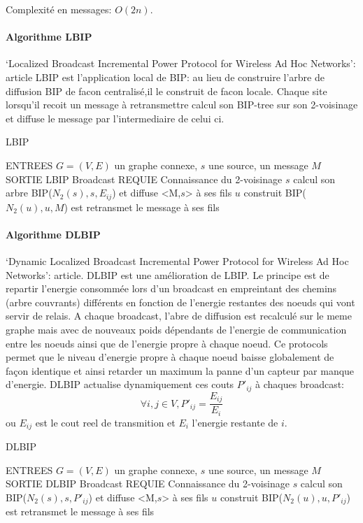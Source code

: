 Complexité en messages: $O(2n)$.


\paragraph{Algorithme LBIP}  `Localized Broadcast Incremental Power Protocol for Wireless Ad Hoc Networks': article \cite{Ingelrest2004}
LBIP est l'application local de BIP: au lieu de construire l'arbre de diffusion BIP de facon centralisé,il le construit de facon locale.
Chaque site lorsqu'il recoit un message à retransmettre calcul son BIP-tree sur son 2-voisinage et diffuse le message par l'intermediaire de celui ci.

\begin{algorithm}[h]
\caption{LBIP}
\label{algo_LBIP}
\begin{algorithmic}
\STATE ENTREES  $G=(V,E)$ un graphe connexe, $s$ une source, un message $M$
\STATE SORTIE  LBIP Broadcast
\STATE REQUIE  Connaissance du 2-voisinage
\STATE $s$ calcul son arbre BIP($N_2(s),s,E_{ij}$) et diffuse <M,$s$> à ses fils
		\STATE $u$ construit BIP($N_2(u),u,M$) est retransmet le message à ses fils
	\ENDIF
\ENDIF
\end{algorithmic}
\end{algorithm}


\paragraph{Algorithme DLBIP}
`Dynamic Localized Broadcast Incremental Power Protocol for Wireless Ad Hoc Networks': article\cite{Champ2009DLBIP}.
DLBIP est une amélioration de LBIP. Le principe est de repartir l'energie consommée lors d'un broadcast en empreintant des chemins (arbre couvrants) différents en fonction de l'energie restantes des noeuds qui vont servir de relais.
A chaque broadcast, l'abre de diffusion est recalculé sur le meme graphe mais avec de nouveaux poids dépendants de l'energie de communication entre les noeuds ainsi que de l'energie propre à chaque noeud. Ce protocols permet que
le niveau d'energie propre à chaque noeud baisse globalement de façon identique et ainsi retarder un maximum la panne d'un capteur par manque d'energie.
DLBIP actualise dynamiquement ces couts $P'_{ij}$ à chaques broadcast:
$$ \forall i,j \in V, P'_{ij}=\frac{E_{ij}}{E_i}$$
ou $E_{ij}$ est le cout reel de transmition et $E_i$ l'energie restante de $i$.


\begin{algorithm}[h]
\caption{DLBIP}
\label{algo_DLBIP}
\begin{algorithmic}
\STATE ENTREES  $G=(V,E)$ un graphe connexe, $s$ une source, un message $M$
\STATE SORTIE  DLBIP Broadcast
\STATE REQUIE  Connaissance du 2-voisinage
\STATE $s$ calcul son BIP($N_2(s),s,P'_{ij}$) et diffuse <M,$s$> à ses fils
		\STATE $u$ construit BIP($N_2(u),u,P'_{ij}$) est retransmet le message à ses fils
	\ENDIF
\ENDIF
\end{algorithmic}
\end{algorithm}



